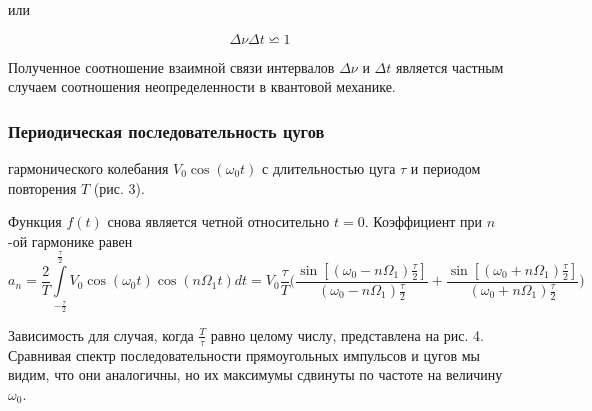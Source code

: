 \documentclass[a4paper, 12pt]{article}
\begin{document}
                или

                \begin{equation}\label{neopr}
                    \Delta \nu \Delta t \backsimeq 1
                \end{equation}

                Полученное соотношение взаимной связи интервалов $\Delta \nu$ и $\Delta t$ является частным случаем соотношения неопределенности в квантовой механике.

            \subsubsection{Периодическая последовательность цугов}

                гармонического колебания $V_{0}\cos(\omega_{0}t)$ с длительностью цуга $\tau$ и периодом повторения $T$ (рис. 3).

                Функция $f(t)$ снова является четной относительно $t=0$. Коэффициент при $n$-ой гармонике равен
                \begin{equation}
                    a_{n}=\dfrac{2}{T}\int\limits_{-\frac{\tau}{2}}^{\frac{\tau}{2}}V_{0}\cos(\omega_{0}t)\cos(n \Omega_{1} t)dt=V_{0}\dfrac{\tau}{T} \bigg(\dfrac{\sin[(\omega_{0}-n\Omega_{1})\frac{\tau}{2}]}{(\omega_{0}-n\Omega_{1})\frac{\tau}{2}}+\dfrac{\sin[(\omega_{0}+n\Omega_{1})\frac{\tau}{2}]}{(\omega_{0}+n\Omega_{1})\frac{\tau}{2}} \bigg)
                    \label{eq6}
                \end{equation}

                Зависимость для случая, когда $\frac{T}{\tau}$ равно целому числу, представлена на рис. 4. Сравнивая спектр последовательности прямоугольных импульсов и цугов мы видим, что они аналогичны, но их максимумы сдвинуты по частоте на величину $\omega_{0}$.
\end{document}
